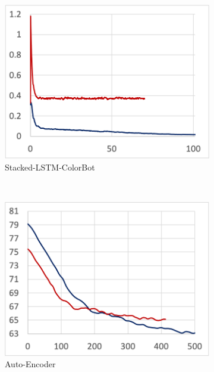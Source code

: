 \begin{figure}[!ht]
\begin{subfigure}[t]{.24\textwidth}
    \includegraphics[width=\textwidth]{tf2-10}
    \caption{Stacked-LSTM-ColorBot}
  \end{subfigure}
  ~
  \begin{subfigure}[t]{.24\textwidth}
    \includegraphics[width=\textwidth]{tf2-11}
    \caption{Auto-Encoder}
  \end{subfigure}
  \par\bigskip
  \begin{subfigure}[t]{.24\textwidth}

\end{subfigure}
\end{figure}
